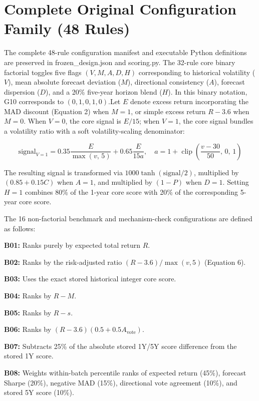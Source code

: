 \documentclass[11pt,a4paper]{article}
\numberwithin{table}{section}
\begin{document}
\appendix
\section{Complete Original Configuration Family (48 Rules)}

The complete 48-rule configuration manifest and executable Python definitions are preserved in frozen\_design.json and scoring.py. The 32-rule core binary factorial toggles five flags $(V, M, A, D, H)$ corresponding to historical volatility ($V$), mean absolute forecast deviation ($M$), directional consistency ($A$), forecast dispersion ($D$), and a 20\% five-year horizon blend ($H$). In this binary notation, G10 corresponds to $(0, 1, 0, 1, 0)$.Let $E$ denote excess return incorporating the MAD discount (Equation 2) when $M = 1$, or simple excess return $R - 3.6$ when $M = 0$. When $V = 0$, the core signal is $E / 15$; when $V = 1$, the core signal bundles a volatility ratio with a soft volatility-scaling denominator:

\begin{equation}\text{signal}_{V=1} = 0.35\frac{E}{\max(v,\, 5)} + 0.65\frac{E}{15a}, \quad a = 1 + \operatorname{clip}\left(\frac{v - 30}{50},\, 0,\, 1\right) \end{equation}

The resulting signal is transformed via $1000\tanh(\text{signal} / 2)$, multiplied by $(0.85 + 0.15C)$ when $A = 1$, and multiplied by $(1 - P)$ when $D = 1$. Setting $H = 1$ combines 80\% of the 1-year core score with 20\% of the corresponding 5-year core score.

The 16 non-factorial benchmark and mechanism-check configurations are defined as follows:

\textbf{B01:}  Ranks purely by expected total return $R$.

\textbf{B02:}  Ranks by the risk-adjusted ratio $(R - 3.6) / \max(v, 5)$ (Equation 6).

\textbf{B03:}  Uses the exact stored historical integer core score.

\textbf{B04:}  Ranks by $R - M$.

\textbf{B05:}  Ranks by $R - s$.

\textbf{B06:}  Ranks by $(R - 3.6)(0.5 + 0.5A_{\text{vote}})$.

\textbf{B07:}  Subtracts 25\% of the absolute stored 1Y/5Y score difference from the stored 1Y score.

\textbf{B08:}  Weights within-batch percentile ranks of expected return (45\%), forecast Sharpe (20\%), negative MAD (15\%), directional vote agreement (10\%), and stored 5Y score (10\%).
\end{document}
